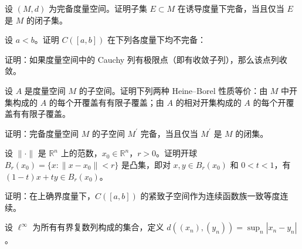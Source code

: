 \noindent\begin{minipage}{\textwidth}
设 $(M,d)$ 为完备度量空间。证明子集 $E\subset M$ 在诱导度量下完备，当且仅当 $E$ 是 $M$ 的闭子集。
\end{minipage}\par\vfill
\newpage
\noindent\begin{minipage}{\textwidth}
设 $a<b$。证明 $C([a,b])$ 在下列各度量下均不完备：
\end{minipage}\par\vfill
\noindent\begin{minipage}{\textwidth}
证明：如果度量空间中的 Cauchy 列有极限点（即有收敛子列），那么该点列收敛。
\end{minipage}\par\vfill
\noindent\begin{minipage}{\textwidth}
设 $A$ 是度量空间 $M$ 的子空间。证明下列两种 Heine--Borel 性质等价：由 $M$ 中开集构成的 $A$ 的每个开覆盖有有限子覆盖；由 $A$ 的相对开集构成的 $A$ 的每个开覆盖有有限子覆盖。
\end{minipage}\par\vfill
\noindent\begin{minipage}{\textwidth}
证明：完备度量空间 $M$ 的子空间 $M^{\prime}$ 完备，当且仅当 $M^{\prime}$ 是 $M$ 的闭集。
\end{minipage}\par\vfill
\newpage
\noindent\begin{minipage}{\textwidth}
设 $\|\cdot\|$ 是 $\mathbb R^n$ 上的范数，$x_0\in\mathbb R^n$，$r>0$。证明开球 $B_r(x_0)=\{x:\|x-x_0\|<r\}$ 是凸集，即对 $x,y\in B_r(x_0)$ 和 $0<t<1$，有 $(1-t)x+ty\in B_r(x_0)$。
\end{minipage}\par\vfill
\noindent\begin{minipage}{\textwidth}
证明：在上确界度量下，$C([a,b])$ 的紧致子空间作为连续函数族一致等度连续。
\end{minipage}\par\vfill
\noindent\begin{minipage}{\textwidth}
设 $\ell^\infty$ 为所有有界复数列构成的集合，定义 $d((x_n),(y_n))=\sup_n|x_n-y_n|$。
\end{minipage}\par\vfill

